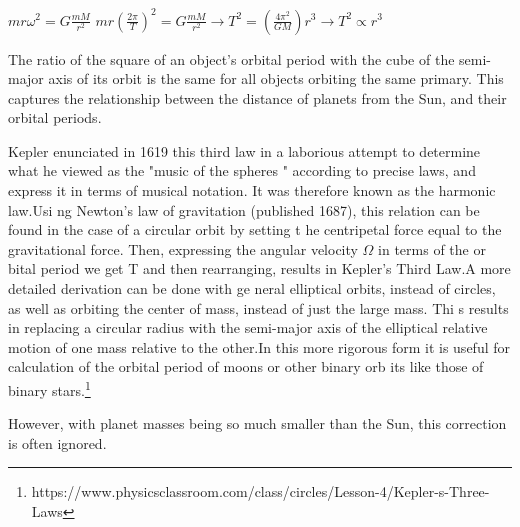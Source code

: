 ${\displaystyle mr\omega ^{2}=G{\frac {mM}{r^{2}}}}$
${\displaystyle mr\left({\frac {2\pi }{T}}\right)^{2}=G{\frac {mM}{r^{2}}}\rightarrow T^{2}=\left({\frac {4\pi ^{2}}{GM}
}\right)r^{3}\rightarrow T^{2}\propto r^{3}}$

The ratio of the square of an object's orbital period with the cube of the semi-major axis of its orbit is the same for
all objects orbiting the same primary.
This captures the relationship between the distance of planets from the Sun, and their orbital periods.

Kepler enunciated in 1619 this third law in a laborious attempt to determine what he viewed as the "music of the spheres
" according to precise laws, and express it in terms of musical notation. It was therefore known as the harmonic law.Usi
ng Newton's law of gravitation (published 1687), this relation can be found in the case of a circular orbit by setting t
he centripetal force equal to the gravitational force. Then, expressing the angular velocity $\Omega$ in terms of the or
bital period we get T and then rearranging, results in Kepler's Third Law.A more detailed derivation can be done with ge
neral elliptical orbits, instead of circles, as well as orbiting the center of mass, instead of just the large mass. Thi
s results in replacing a circular radius with the semi-major axis of the elliptical relative motion of one mass relative
 to the other.In this more rigorous form it is useful for calculation of the orbital period of moons or other binary orb
its like those of binary stars.\footnote[1]{https://www.physicsclassroom.com/class/circles/Lesson-4/Kepler-s-Three-Laws}

However, with planet masses being so much smaller than the Sun, this correction is often ignored.
